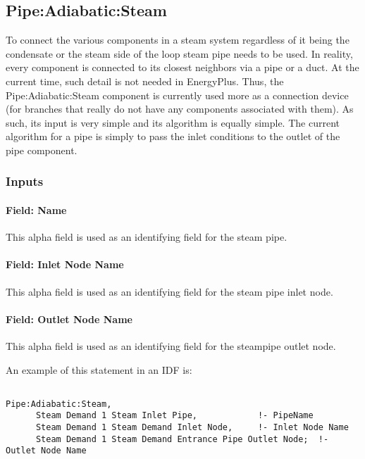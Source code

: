 \subsection{Pipe:Adiabatic:Steam}\label{pipeadiabaticsteam}

To connect the various components in a steam system regardless of it being the condensate or the steam side of the loop steam pipe needs to be used. In reality, every component is connected to its closest neighbors via a pipe or a duct. At the current time, such detail is not needed in EnergyPlus. Thus, the Pipe:Adiabatic:Steam component is currently used more as a connection device (for branches that really do not have any components associated with them). As such, its input is very simple and its algorithm is equally simple. The current algorithm for a pipe is simply to pass the inlet conditions to the outlet of the pipe component.

\subsubsection{Inputs}\label{inputs-5-017}

\paragraph{Field: Name}\label{field-name-5-013}

This alpha field is used as an identifying field for the steam pipe.

\paragraph{Field: Inlet Node Name}\label{field-inlet-node-name-1-000}

This alpha field is used as an identifying field for the steam pipe inlet node.

\paragraph{Field: Outlet Node Name}\label{field-outlet-node-name-1-001}

This alpha field is used as an identifying field for the steampipe outlet node.

An example of this statement in an IDF is:

\begin{lstlisting}

Pipe:Adiabatic:Steam,
      Steam Demand 1 Steam Inlet Pipe,            !- PipeName
      Steam Demand 1 Steam Demand Inlet Node,     !- Inlet Node Name
      Steam Demand 1 Steam Demand Entrance Pipe Outlet Node;  !- Outlet Node Name
\end{lstlisting}

